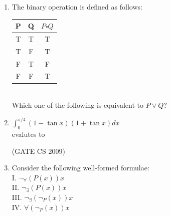 \documentclass[a4paper, 11pt]{article}
\begin{document}
\begin{enumerate}
    \item  The binary operation is defined as follows:\\
    \begin{tabular}{|c|c|c|}
        \hline
        P & Q & $P\square Q$ \\
        \hline
        T & T & T \\
        \hline
        T & F & T \\
        \hline
        F & T & F \\
        \hline
        F & F & T\\
        \hline
    \end{tabular}\\
    Which one of the following is equivalent to $P \lor Q$?
    \begin{enumerate}
    \end{enumerate}

    \item $\int_0^{\pi/4} (1 - \tan x)(1 + \tan x)dx$\\
    evalutes to
    \begin{enumerate}
    \end{enumerate}

    \hfill (GATE CS 2009)

    \item Consider the following well-formed formulae:\\
    I. $\neg_ \forall (P(x))x$\\
    II. $\neg_ \exists (P(x))x$\\
    III. $\neg_ \exists (\neg_ P(x))x$\\
    IV. $\forall (\neg_ P(x))x$


\end{enumerate}
\end{document}
